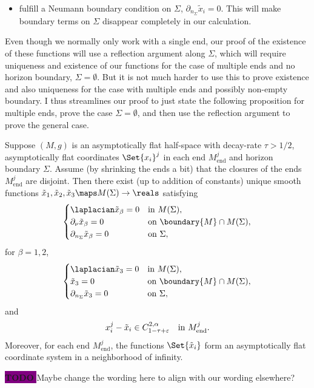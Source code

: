 \documentclass[titlepage,numbers=noenddot,headinclude,oneside,%
footinclude=true,cleardoublepage=empty,%
BCOR=5mm,paper=a4,fontsize=11pt,%
english,%
]{scrartcl}
\newcommand{\Mend}{M_{\mathrm{end}}} %
\newcommand{\todomark}{%
    \colorbox{purple}{%
        \textnormal\ttfamily\bfseries\color{white}%
        TODO%
    }%
}
\newcommand{\todo}[1][]{%
    \ifstrempty{#1}{%
        \def\todotext{Todo}%
    }{%
        \def\todotext{Todo: #1}%
    }%
    \todomark%
    {%
        \marginpar{%
            \raggedright\normalfont\sffamily\scriptsize\todotext%
        }%
    }%
}
\begin{document}
\begin{itemize}
    \item fulfill a Neumann boundary condition on \( \Sigma \), \ie \( \partial_{n_\Sigma}\tilde{x}_i=0 \). This will make boundary terms on \( \Sigma \) disappear completely in our calculation.
\end{itemize} 



Even though we normally only work with a single end, our proof of the existence of these functions will use a reflection argument along \( \Sigma \), which will require uniqueness and existence of our functions for the case of multiple ends and no horizon boundary, \ie \( \Sigma=\emptyset \). But it is not much harder to use this to prove existence and also uniqueness for the case with multiple ends and possibly non-empty boundary. I thus streamlines our proof to just state the following proposition for multiple ends, prove the case \( \Sigma=\emptyset \), and then use the reflection argument to prove the general case.
\begin{proposition}\label{prop:existence_and_uniqueness}
    Suppose \( (M,g) \) is an asymptotically flat half-space with decay-rate \( \tau>1/2 \), asymptotically flat coordinates \( \Set{x_i}^j \) in each end \( \Mend^j \) and horizon boundary \( \Sigma \). Assume (\eg by shrinking the ends a bit) that the closures of the ends \( \Mend^j \) are disjoint. Then there exist (up to addition of constants) unique smooth functions \( \tilde{x}_1,\tilde{x}_2,\tilde{x}_3\maps M(\Sigma)\to \reals \) satisfying
    \begin{equation*}
        \begin{cases}
            \laplacian \tilde{x}_\beta=0& \text{in \( M(\Sigma) \)},\\
            \partial_\nu \tilde{x}_\beta=0& \text{on \( \boundary{M}\cap M(\Sigma) \)},\\
            \partial_{n_\Sigma}\tilde{x}_\beta=0&\text{on \( \Sigma \)},
        \end{cases}
    \end{equation*}
    for \( \beta=1,2 \),
    \begin{equation*}
        \begin{cases}
            \laplacian \tilde{x}_3=0& \text{in \( M(\Sigma) \)},\\
            \tilde{x}_3=0& \text{on \( \boundary{M}\cap M(\Sigma) \)},\\
            \partial_{n_{\Sigma}}\tilde{x}_3=0& \text{on \( \Sigma \)},
        \end{cases}
    \end{equation*}
    and
    \begin{equation*}
        x_i^j-\tilde{x}_i\in C_{1-\tau+\varepsilon}^{2,\alpha} \quad \text{in \( \Mend^j \)}.
    \end{equation*}
    Moreover, for each end \( \Mend^j \), the functions \( \Set{\tilde{x}_i} \) form an asymptotically flat coordinate system in a neighborhood of infinity.
    
    \todo{Maybe change the wording here to align with our wording elsewhere?}
\end{proposition} 
\end{document}
